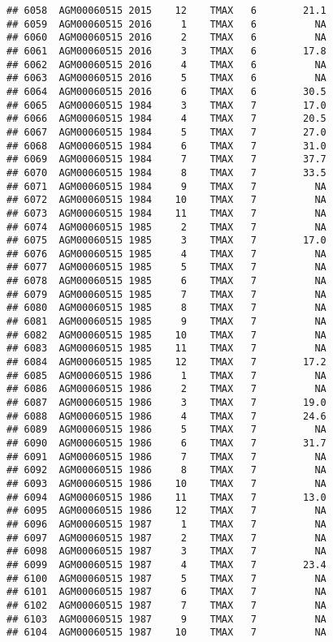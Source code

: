 \documentclass{article}\usepackage[]{graphicx}\usepackage[]{color}
\makeatletter
\newenvironment{kframe}{%
 \def\at@end@of@kframe{}%
 \ifinner\ifhmode%
  \def\at@end@of@kframe{\end{minipage}}%
  \begin{minipage}{\columnwidth}%
 \fi\fi%
 \def\FrameCommand##1{\hskip\@totalleftmargin \hskip-\fboxsep
 \colorbox{shadecolor}{##1}\hskip-\fboxsep
     \hskip-\linewidth \hskip-\@totalleftmargin \hskip\columnwidth}%
 \MakeFramed {\advance\hsize-\width
   \@totalleftmargin\z@ \linewidth\hsize
   \@setminipage}}%
 {\par\unskip\endMakeFramed%
 \at@end@of@kframe}
\newenvironment{knitrout}{}{} %
\makeatother
\begin{document}
\begin{knitrout}
\begin{kframe}
\begin{verbatim}
## 6058  AGM00060515 2015    12    TMAX   6        21.1
## 6059  AGM00060515 2016     1    TMAX   6          NA
## 6060  AGM00060515 2016     2    TMAX   6          NA
## 6061  AGM00060515 2016     3    TMAX   6        17.8
## 6062  AGM00060515 2016     4    TMAX   6          NA
## 6063  AGM00060515 2016     5    TMAX   6          NA
## 6064  AGM00060515 2016     6    TMAX   6        30.5
## 6065  AGM00060515 1984     3    TMAX   7        17.0
## 6066  AGM00060515 1984     4    TMAX   7        20.5
## 6067  AGM00060515 1984     5    TMAX   7        27.0
## 6068  AGM00060515 1984     6    TMAX   7        31.0
## 6069  AGM00060515 1984     7    TMAX   7        37.7
## 6070  AGM00060515 1984     8    TMAX   7        33.5
## 6071  AGM00060515 1984     9    TMAX   7          NA
## 6072  AGM00060515 1984    10    TMAX   7          NA
## 6073  AGM00060515 1984    11    TMAX   7          NA
## 6074  AGM00060515 1985     2    TMAX   7          NA
## 6075  AGM00060515 1985     3    TMAX   7        17.0
## 6076  AGM00060515 1985     4    TMAX   7          NA
## 6077  AGM00060515 1985     5    TMAX   7          NA
## 6078  AGM00060515 1985     6    TMAX   7          NA
## 6079  AGM00060515 1985     7    TMAX   7          NA
## 6080  AGM00060515 1985     8    TMAX   7          NA
## 6081  AGM00060515 1985     9    TMAX   7          NA
## 6082  AGM00060515 1985    10    TMAX   7          NA
## 6083  AGM00060515 1985    11    TMAX   7          NA
## 6084  AGM00060515 1985    12    TMAX   7        17.2
## 6085  AGM00060515 1986     1    TMAX   7          NA
## 6086  AGM00060515 1986     2    TMAX   7          NA
## 6087  AGM00060515 1986     3    TMAX   7        19.0
## 6088  AGM00060515 1986     4    TMAX   7        24.6
## 6089  AGM00060515 1986     5    TMAX   7          NA
## 6090  AGM00060515 1986     6    TMAX   7        31.7
## 6091  AGM00060515 1986     7    TMAX   7          NA
## 6092  AGM00060515 1986     8    TMAX   7          NA
## 6093  AGM00060515 1986    10    TMAX   7          NA
## 6094  AGM00060515 1986    11    TMAX   7        13.0
## 6095  AGM00060515 1986    12    TMAX   7          NA
## 6096  AGM00060515 1987     1    TMAX   7          NA
## 6097  AGM00060515 1987     2    TMAX   7          NA
## 6098  AGM00060515 1987     3    TMAX   7          NA
## 6099  AGM00060515 1987     4    TMAX   7        23.4
## 6100  AGM00060515 1987     5    TMAX   7          NA
## 6101  AGM00060515 1987     6    TMAX   7          NA
## 6102  AGM00060515 1987     7    TMAX   7          NA
## 6103  AGM00060515 1987     9    TMAX   7          NA
## 6104  AGM00060515 1987    10    TMAX   7          NA

\end{verbatim}
\end{kframe}
\end{knitrout}
\end{document}
